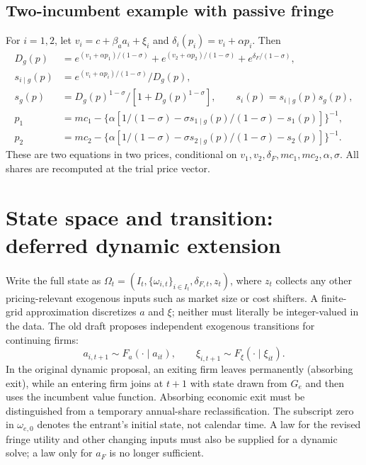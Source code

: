\documentclass[11pt]{article}
\begin{document}
\subsection*{Two-incumbent example with passive fringe}
For $i=1,2$, let $v_i=c+\beta_a a_i+\xi_i$ and $\delta_i(p_i)=v_i+\alpha p_i$. Then
\begin{align*}
D_g(p)&=e^{(v_1+\alpha p_1)/(1-\sigma)}+e^{(v_2+\alpha p_2)/(1-\sigma)}+e^{\delta_F/(1-\sigma)},\\
s_{i\mid g}(p)&=e^{(v_i+\alpha p_i)/(1-\sigma)}/D_g(p),\\
s_g(p)&=D_g(p)^{1-\sigma}/[1+D_g(p)^{1-\sigma}],\qquad s_i(p)=s_{i\mid g}(p)s_g(p),\\
p_1&=mc_1-\{\alpha[1/(1-\sigma)-\sigma s_{1\mid g}(p)/(1-\sigma)-s_1(p)]\}^{-1},\\
p_2&=mc_2-\{\alpha[1/(1-\sigma)-\sigma s_{2\mid g}(p)/(1-\sigma)-s_2(p)]\}^{-1}.
\end{align*}
These are two equations in two prices, conditional on $v_1,v_2,\delta_F,mc_1,mc_2,\alpha,\sigma$. All shares are recomputed at the trial price vector.

\section{State space and transition: deferred dynamic extension}
Write the full state as $\Omega_t=(I_t,\{\omega_{i,t}\}_{i\in I_t},\delta_{F,t},z_t)$, where $z_t$ collects any other pricing-relevant exogenous inputs such as market size or cost shifters. A finite-grid approximation discretizes $a$ and $\xi$; neither must literally be integer-valued in the data. The old draft proposes independent exogenous transitions for continuing firms:
\begin{equation}\label{eq:transition}
a_{i,t+1}\sim F_a(\cdot\mid a_{it}),\qquad \xi_{i,t+1}\sim F_\xi(\cdot\mid\xi_{it}).
\end{equation}
In the original dynamic proposal, an exiting firm leaves permanently (absorbing exit), while an entering firm joins at $t+1$ with state drawn from $G_e$ and then uses the incumbent value function. Absorbing economic exit must be distinguished from a temporary annual-share reclassification. The subscript zero in $\omega_{e,0}$ denotes the entrant's initial state, not calendar time. A law for the revised fringe utility and other changing inputs must also be supplied for a dynamic solve; a law only for $a_F$ is no longer sufficient.
\end{document}
